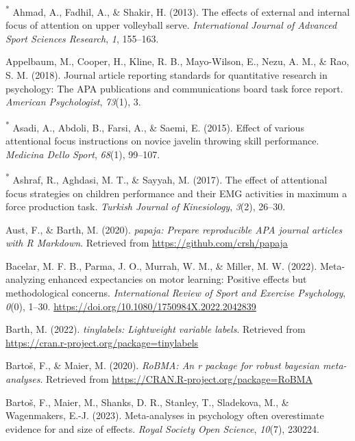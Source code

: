 \documentclass[
  man, donotrepeattitle,floatsintext]{apa7}
\newlength{\cslhangindent}
\newlength{\cslentryspacingunit} %
\newenvironment{CSLReferences}[2] %
 {%
  \setlength{\parindent}{0pt}
  \ifodd #1
  \let\oldpar\par
  \def\par{\hangindent=\cslhangindent\oldpar}
  \fi
  \setlength{\parskip}{#2\cslentryspacingunit}
 }%
 {}
\begin{document}
\begin{CSLReferences}{1}{0}
\leavevmode{}%
\textsuperscript{*} Ahmad, A., Fadhil, A., \& Shakir, H. (2013). The effects of external and internal focus of attention on upper volleyball serve. \emph{International Journal of Advanced Sport Sciences Research}, \emph{1}, 155--163.

\leavevmode{}%
Appelbaum, M., Cooper, H., Kline, R. B., Mayo-Wilson, E., Nezu, A. M., \& Rao, S. M. (2018). Journal article reporting standards for quantitative research in psychology: The APA publications and communications board task force report. \emph{American Psychologist}, \emph{73}(1), 3.

\leavevmode{}%
\textsuperscript{*} Asadi, A., Abdoli, B., Farsi, A., \& Saemi, E. (2015). Effect of various attentional focus instructions on novice javelin throwing skill performance. \emph{Medicina Dello Sport}, \emph{68}(1), 99--107.

\leavevmode{}%
\textsuperscript{*} Ashraf, R., Aghdasi, M. T., \& Sayyah, M. (2017). The effect of attentional focus strategies on children performance and their EMG activities in maximum a force production task. \emph{Turkish Journal of Kinesiology}, \emph{3}(2), 26--30.

\leavevmode{}%
Aust, F., \& Barth, M. (2020). \emph{{papaja}: {Prepare} reproducible {APA} journal articles with {R Markdown}}. Retrieved from \url{https://github.com/crsh/papaja}

\leavevmode{}%
Bacelar, M. F. B., Parma, J. O., Murrah, W. M., \& Miller, M. W. (2022). Meta-analyzing enhanced expectancies on motor learning: Positive effects but methodological concerns. \emph{International Review of Sport and Exercise Psychology}, \emph{0}(0), 1--30. \url{https://doi.org/10.1080/1750984X.2022.2042839}

\leavevmode{}%
Barth, M. (2022). \emph{{tinylabels}: Lightweight variable labels}. Retrieved from \url{https://cran.r-project.org/package=tinylabels}

\leavevmode{}%
Bartoš, F., \& Maier, M. (2020). \emph{RoBMA: An r package for robust bayesian meta-analyses}. Retrieved from \url{https://CRAN.R-project.org/package=RoBMA}

\leavevmode{}%
Bartoš, F., Maier, M., Shanks, D. R., Stanley, T., Sladekova, M., \& Wagenmakers, E.-J. (2023). Meta-analyses in psychology often overestimate evidence for and size of effects. \emph{Royal Society Open Science}, \emph{10}(7), 230224.


\end{CSLReferences}
\end{document}
